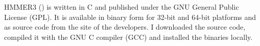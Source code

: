 HMMER3 (\cite{eddy2011}) is written in C and published under the GNU General
Public License (GPL). It is available in binary form for 32-bit and 64-bit
platforms and as source code from the site of the developers.  I downloaded the
source code, compiled it with the GNU C compiler (GCC) and installed the binaries
locally. 
